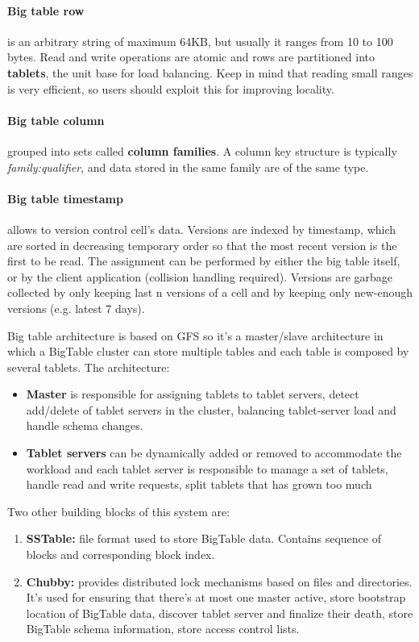 \documentclass{article}
\begin{document}
\paragraph{Big table row} is an arbitrary string of maximum 64KB, but usually it ranges from 10 to 100 bytes. Read and write operations are atomic and rows are partitioned into \textbf{tablets}, the unit base for load balancing. Keep in mind that reading small ranges is very efficient, so users should exploit this for improving locality. 

\paragraph{Big table column} grouped into sets called \textbf{column families}. A column key structure is typically \textit{family:qualifier}, and data stored in the same family are of the same type.

\paragraph{Big table timestamp} allows to version control cell's data. Versions are indexed by timestamp, which are sorted in decreasing temporary order so that the most recent version is the first to be read. The assignment can be performed by either the big table itself, or by the client application (collision handling required). Versions are garbage collected by only keeping last n versions of a cell and by keeping only new-enough versions (e.g. latest 7 days).

\bigskip
Big table architecture is based on GFS so it's a master/slave architecture in which a BigTable cluster can store multiple tables and each table is composed by several tablets. The architecture:
\begin{itemize}
    \item \textbf{Master} is responsible for assigning tablets to tablet servers, detect add/delete of tablet servers in the cluster, balancing tablet-server load and handle schema changes.
    \item \textbf{Tablet servers} can be dynamically added or removed to accommodate the workload and each tablet server is responsible to manage a set of tablets, handle read and write requests, split tablets that has grown too much
\end{itemize}

Two other building blocks of this system are:
\begin{enumerate}
    \item \textbf{SSTable:} file format used to store BigTable data. Contains sequence of blocks and corresponding block index.
    \item \textbf{Chubby:} provides distributed lock mechanisms based on files and directories. It's used for ensuring that there's at most one master active, store bootstrap location of BigTable data, discover tablet server and finalize their death, store BigTable schema information, store access control lists.
\end{enumerate}
\end{document}
